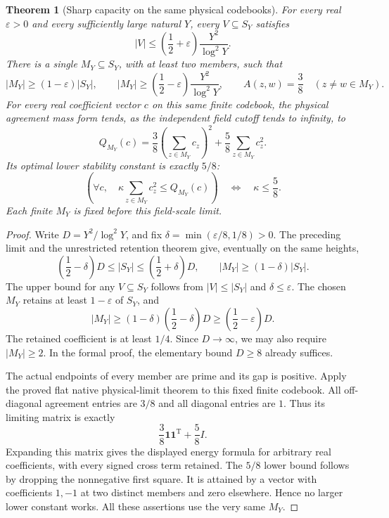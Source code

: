 \documentclass[11pt]{article}
\newtheorem{theorem}{Theorem}[section]
\begin{document}
\begin{theorem}[Sharp capacity on the same physical codebooks]
\label{thm:native-full-capacity}
For every real \(\varepsilon>0\) and every sufficiently large natural
\(Y\), every \(V\subseteq S_Y\) satisfies
\[
 |V|\le\left(\frac12+\varepsilon\right)
       \frac{Y^2}{\log^2Y}.
\]
There is a single \(M_Y\subseteq S_Y\), with at least two members,
such that
\[
 |M_Y|\ge(1-\varepsilon)|S_Y|,\qquad
 |M_Y|\ge\left(\frac12-\varepsilon\right)
       \frac{Y^2}{\log^2Y},
 \qquad A(z,w)=\frac38\quad(z\ne w\in M_Y).
\]
For every real coefficient vector \(c\) on this same finite codebook,
the physical agreement mass form tends, as the independent field
cutoff tends to infinity, to
\[
 Q_{M_Y}(c)=\frac38\left(\sum_{z\in M_Y}c_z\right)^2
            +\frac58\sum_{z\in M_Y}c_z^2.
\]
Its optimal lower stability constant is exactly \(5/8\):
\[
 \left(\forall c,\quad
   \kappa\sum_{z\in M_Y}c_z^2\le Q_{M_Y}(c)\right)
 \quad\Longleftrightarrow\quad \kappa\le\frac58.
\]
Each finite \(M_Y\) is fixed before this field-scale limit.
\end{theorem}

\begin{proof}
Write \(D=Y^2/\log^2Y\), and fix
\(\delta=\min(\varepsilon/8,1/8)>0\).
The preceding limit and the unrestricted retention theorem give,
eventually on the same heights,
\[
 \left(\frac12-\delta\right)D
 \le |S_Y|\le\left(\frac12+\delta\right)D,
 \qquad
 |M_Y|\ge(1-\delta)|S_Y|.
\]
The upper bound for any \(V\subseteq S_Y\) follows from
\(|V|\le|S_Y|\) and \(\delta\le\varepsilon\).
The chosen \(M_Y\) retains at least \(1-\varepsilon\) of \(S_Y\), and
\[
 |M_Y|\ge
 (1-\delta)\left(\frac12-\delta\right)D
 \ge\left(\frac12-\varepsilon\right)D.
\]
The retained coefficient is at least \(1/4\). Since \(D\to\infty\),
we may also require \(|M_Y|\ge2\).
In the formal proof, the elementary bound \(D\ge8\) already suffices.

The actual endpoints of every member are prime and its gap is positive.
Apply the proved flat native physical-limit theorem to this fixed
finite codebook. All off-diagonal agreement entries are \(3/8\) and
all diagonal entries are \(1\). Thus its limiting matrix is exactly
\[
 \frac38\mathbf 1\mathbf 1^{\mathrm T}+\frac58 I.
\]
Expanding this matrix gives the displayed energy formula for arbitrary
real coefficients, with every signed cross term retained.
The \(5/8\) lower bound follows by dropping the nonnegative first
square. It is attained by a vector with coefficients \(1,-1\) at
two distinct members and zero elsewhere. Hence no larger lower
constant works. All these assertions use the very same \(M_Y\).
\end{proof}
\end{document}
